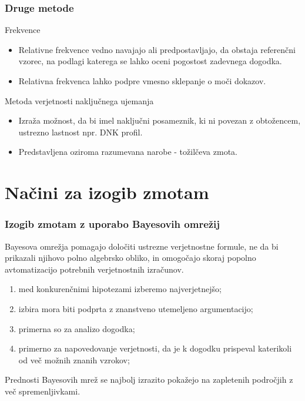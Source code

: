 \documentclass{beamer}
\begin{document}
\begin{frame}
   \frametitle{Druge metode}
   \begin{block}{Frekvence}
      \begin{itemize}
         \item Relativne frekvence vedno navajajo ali predpostavljajo, da obstaja referenčni vzorec, na podlagi katerega se lahko oceni pogostost zadevnega dogodka.
         \item Relativna frekvenca lahko podpre vmesno sklepanje o moči dokazov.
      \end{itemize}
   \end{block} \vspace{2mm}
   \begin{block}{Metoda verjetnosti naključnega ujemanja}
      \begin{itemize}
         \item Izraža možnost, da bi imel naključni posameznik, ki ni povezan z obtožencem, ustrezno lastnost npr. DNK profil.
         \item Predstavljena oziroma razumevana narobe - tožilčeva zmota.
      \end{itemize}
   \end{block}
\end{frame}

\section{Načini za izogib zmotam}

\begin{frame}
   \frametitle{Izogib zmotam z uporabo Bayesovih omrežij}
   \begin{block}{}
       Bayesova omrežja pomagajo določiti ustrezne verjetnostne formule, ne da bi prikazali njihovo polno algebrsko obliko, in omogočajo skoraj popolno avtomatizacijo potrebnih verjetnostnih izračunov.
   \end{block} \vspace{3mm}
   \begin{enumerate}
       \item med konkurenčnimi hipotezami izberemo najverjetnejšo;
       \item izbira mora biti podprta z znanstveno utemeljeno argumentacijo;
       \item primerna so za analizo dogodka;
       \item primerno za napovedovanje verjetnosti, da je k dogodku prispeval katerikoli od več možnih znanih vzrokov;
   \end{enumerate}
   \begin{block}{}
       Prednosti Bayesovih mrež se najbolj izrazito pokažejo na zapletenih področjih z več spremenljivkami.
   \end{block}
\end{frame}
\end{document}
